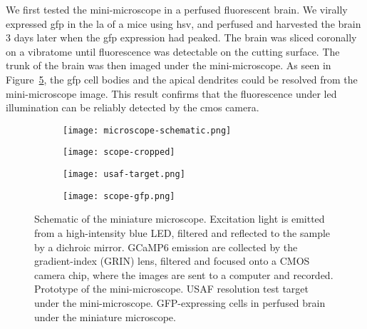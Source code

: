 We first tested the mini-microscope in a perfused fluorescent brain. We virally expressed \gls{gfp} in the \gls{la} of a mice using \gls{hsv}, and perfused and harvested the brain 3 days later when the \gls{gfp} expression had peaked. The brain was sliced coronally on a vibratome until fluorescence was detectable on the cutting surface. The trunk of the brain was then imaged under the mini-microscope. As seen in Figure~\ref{f.scope-gfp}, the \gls{gfp} cell bodies and the apical dendrites could be resolved from the mini-microscope image. This result confirms that the fluorescence under  \gls{led} illumination can be reliably detected by the \gls{cmos} camera.

\begin{figure}[h]
    \begin{subfigure}[t]{.55\textwidth}
        \centering
        \texttt{[image: microscope-schematic.png]}
        \caption{\label{f.scope-schema}}
    \end{subfigure}
    \begin{subfigure}[t]{.45\textwidth}
        \centering
        \texttt{[image: scope-cropped]}
        \caption{\label{f.scope}}
    \end{subfigure}
    \begin{subfigure}[t]{.5\textwidth}
        \centering
        \texttt{[image: usaf-target.png]}
        \caption{\label{f.usaf}}
    \end{subfigure}
    \begin{subfigure}[t]{.5\textwidth}
        \centering
        \texttt{[image: scope-gfp.png]}
        \caption{\label{f.scope-gfp}}
    \end{subfigure}
    \caption[Schematic of the miniature microscope.]{ Schematic of the miniature microscope. Excitation light is emitted from a high-intensity blue LED, filtered and reflected to the sample by a dichroic mirror. GCaMP6 emission are collected by the gradient-index (GRIN) lens, filtered and focused onto a CMOS camera chip, where the images are sent to a computer and recorded. 
              Prototype of the mini-microscope.
              USAF resolution test target under the mini-microscope.
              GFP-expressing cells in perfused brain under the miniature microscope.}
\end{figure}

